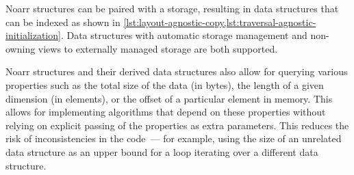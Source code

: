 Noarr structures can be paired with a storage, resulting in data structures that can be indexed as shown in \cref{lst:layout-agnostic-copy,lst:traversal-agnostic-initialization}. Data structures with automatic storage management and non-owning views to externally managed storage are both supported.

Noarr structures and their derived data structures also allow for querying various properties such as the total size of the data (in bytes), the length of a given dimension (in elements), or the offset of a particular element in memory. This allows for implementing algorithms that depend on these properties without relying on explicit passing of the properties as extra parameters. This reduces the risk of inconsistencies in the code~--- for example, using the size of an unrelated data structure as an upper bound for a loop iterating over a different data structure.










